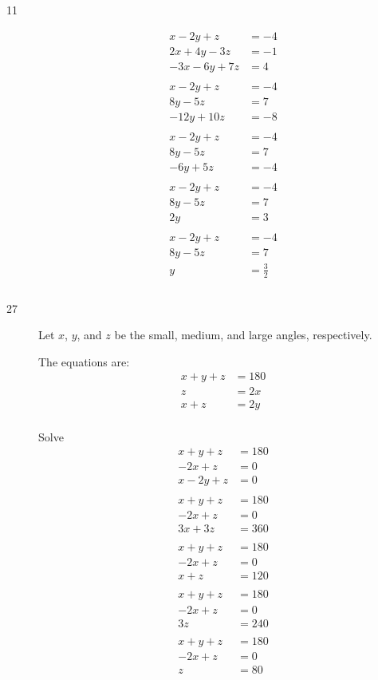\documentclass[fleqn,addpoints]{exam}
\begin{document}
\begin{description}

\item[11]
\begin{align*}
  x-2y+z &= -4 \\
  2x+4y-3z &= -1 \\
  -3x-6y+7z &= 4 \\
\\
  x-2y+z &= -4 \\
  8y-5z &= 7 \\
  -12y+10z &= -8 \\
\\
  x-2y+z &= -4 \\
  8y-5z &= 7 \\
  -6y+5z &= -4 \\
\\
  x-2y+z &= -4 \\
  8y-5z &= 7 \\
  2y &= 3 \\
\\
  x-2y+z &= -4 \\
  8y-5z &= 7 \\
  y &= \frac{3}{2} \\
\\
\end{align*}


\pagebreak

\item[27]
Let $x$, $y$, and $z$ be the small, medium, and large angles, respectively.

The equations are:
\begin{align*}
  x + y + z &= 180 \\
  z &= 2x \\
  x + z &= 2y \\
\end{align*}

Solve
\begin{align*}
  x + y + z &= 180 \\
  -2x + z &= 0 \\
  x -2y + z &= 0 \\
\\
  x + y + z &= 180 \\
  -2x + z &= 0 \\
  3x + 3z &= 360 \\
\\
  x + y + z &= 180 \\
  -2x + z &= 0 \\
  x + z &= 120 \\
\\
  x + y + z &= 180 \\
  -2x + z &= 0 \\
  3z &= 240 \\
\\
  x + y + z &= 180 \\
  -2x + z &= 0 \\
  z &= 80 \\
\\
\end{align*}


\end{description}
\end{document}
